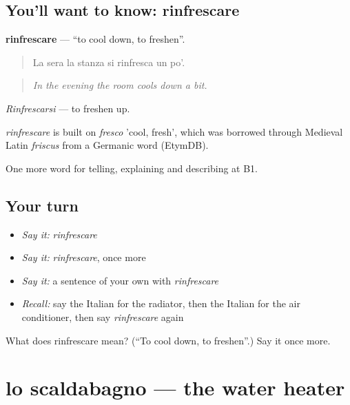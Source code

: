 \subsection*{You'll want to know: rinfrescare}
\textbf{rinfrescare} — \textquotedblleft{}to cool down, to freshen\textquotedblright{}.

\begin{quote}
La sera la stanza si rinfresca un po'.
\end{quote}

\begin{quote}
\emph{In the evening the room cools down a bit.}
\end{quote}

\emph{Rinfrescarsi} — to freshen up.

\begin{cousinweb}
\emph{rinfrescare} is built on \emph{fresco} 'cool, fresh', which was borrowed through Medieval Latin \emph{friscus} from a Germanic word (EtymDB).
\end{cousinweb}

\begin{grammarlens}[title={What you've built}]
One more word for telling, explaining and describing at B1.
\end{grammarlens}

\subsection*{Your turn}
\begin{itemize}
\raggedright
  \item \emph{Say it:} \emph{rinfrescare}
  \item \emph{Say it:} \emph{rinfrescare}, once more
  \item \emph{Say it:} a sentence of your own with \emph{rinfrescare}
  \item \emph{Recall:} say the Italian for the radiator, then the Italian for the air conditioner, then say \emph{rinfrescare} again
\end{itemize}

\begin{tcolorbox}[breakable,colback=teal!4,colframe=teal!35!black,title={Before you move on}]
What does rinfrescare mean? (\textquotedblleft{}To cool down, to freshen\textquotedblright{}.) Say it once more.
\end{tcolorbox}
\section[lo scaldabagno]{lo scaldabagno — the water heater}

